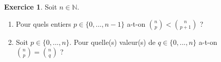 \documentclass[a4paper, 11pt,openany]{article}%
\theoremstyle{plain}
\theoremstyle{definition}
\newtheorem{exo}{Exercice}
\newtheorem{sol}{Solution de l'exercice}
\theoremstyle{remark}
\newcommand{\N}{\mathbb{N}}
\begin{document}


\begin{exo}
Soit $n \in \N$.
\begin{enumerate}
\item Pour quels entiers $p \in \{0,...,n-1\}$ a-t-on $\binom{n}{p} < \binom{n}{p+1}$ ?
\item Soit $p \in \{0,...,n\}$. Pour quelle(s) valeur(s) de $q \in \{0,...,n\}$ a-t-on $\binom{n}{p} = \binom{n}{q}$ ? 
\end{enumerate}

\end{exo}
\end{document}
